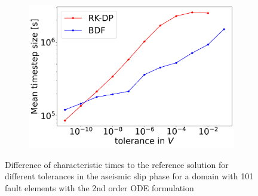 \begin{figure}[H]
\begin{subfigure}[t]{0.32\textwidth}
		\includegraphics[width=1\textwidth]{images/TANDEMextendedODEDifferentTolerancesSize101_AS_DT.png}
	\end{subfigure}
	\caption{Difference of characteristic times to the reference solution for different tolerances in the aseismic slip phase for a domain with 101 fault elements with the 2nd order ODE formulation}
	\label{fig:tolerancesAseismicSlip_extendedODE}
\end{figure}



